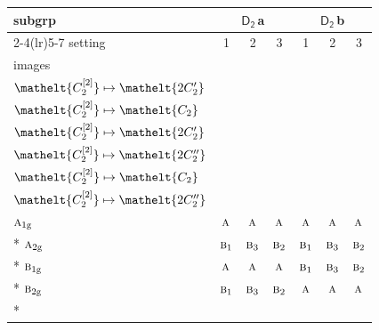 \documentclass[10pt,a4paper]{article}
\numberwithin{equation}{section}
\newcommand{\eltfont}[1]{{\let\sigma\eltsigma\mathelt{#1}}}
\newcommand{\grp}[1]{\mathsf{#1}}
\newcommand{\irr}[1]{\text{\normalfont\scshape #1}}
\newcommand{\cls}[1]{\eltfont{#1}}
\newcommand{\ptag}[1]{\mathrm{#1}}
\newcommand{\clsletter}[1]{\,{\scriptsize\color{black!55}#1}}
\newcommand{\genidx}[2]{#1^{[\mathrm{#2}]}}
\begin{document}
{\small\begin{longtable}{@{}lcccccc@{}}\toprule
subgrp & \multicolumn{3}{c}{\href{D2.pdf}{$\grp{D_{2}}$}\clsletter{a}} & \multicolumn{3}{c}{\href{D2.pdf}{$\grp{D_{2}}$}\clsletter{b}}\\\cmidrule(lr){2-4}\cmidrule(lr){5-7}
setting & 1 & 2 & 3 & 1 & 2 & 3\\
images & {\scriptsize\begin{tabular}[t]{@{}c@{}}$\cls{\genidx{C_{2}}{1}} \mapsto \cls{C_{2}}$\\$\cls{\genidx{C_{2}}{2}} \mapsto \cls{2C_{2}'}$\end{tabular}} & {\scriptsize\begin{tabular}[t]{@{}c@{}}$\cls{\genidx{C_{2}}{1}} \mapsto \cls{2C_{2}'}$\\$\cls{\genidx{C_{2}}{2}} \mapsto \cls{C_{2}}$\end{tabular}} & {\scriptsize\begin{tabular}[t]{@{}c@{}}$\cls{\genidx{C_{2}}{1}} \mapsto \cls{2C_{2}'}$\\$\cls{\genidx{C_{2}}{2}} \mapsto \cls{2C_{2}'}$\end{tabular}} & {\scriptsize\begin{tabular}[t]{@{}c@{}}$\cls{\genidx{C_{2}}{1}} \mapsto \cls{C_{2}}$\\$\cls{\genidx{C_{2}}{2}} \mapsto \cls{2C_{2}''}$\end{tabular}} & {\scriptsize\begin{tabular}[t]{@{}c@{}}$\cls{\genidx{C_{2}}{1}} \mapsto \cls{2C_{2}''}$\\$\cls{\genidx{C_{2}}{2}} \mapsto \cls{C_{2}}$\end{tabular}} & {\scriptsize\begin{tabular}[t]{@{}c@{}}$\cls{\genidx{C_{2}}{1}} \mapsto \cls{2C_{2}''}$\\$\cls{\genidx{C_{2}}{2}} \mapsto \cls{2C_{2}''}$\end{tabular}}\\\midrule\endhead
\bottomrule\endfoot\endlastfoot
$\irr{a}_{1\ptag{g}}$ & $\irr{a}$ & $\irr{a}$ & $\irr{a}$ & $\irr{a}$ & $\irr{a}$ & $\irr{a}$\\*
$\irr{a}_{2\ptag{g}}$ & $\irr{b}_{1}$ & $\irr{b}_{3}$ & $\irr{b}_{2}$ & $\irr{b}_{1}$ & $\irr{b}_{3}$ & $\irr{b}_{2}$\\*
$\irr{b}_{1\ptag{g}}$ & $\irr{a}$ & $\irr{a}$ & $\irr{a}$ & $\irr{b}_{1}$ & $\irr{b}_{3}$ & $\irr{b}_{2}$\\*
$\irr{b}_{2\ptag{g}}$ & $\irr{b}_{1}$ & $\irr{b}_{3}$ & $\irr{b}_{2}$ & $\irr{a}$ & $\irr{a}$ & $\irr{a}$\\*

\end{longtable}}
\end{document}
